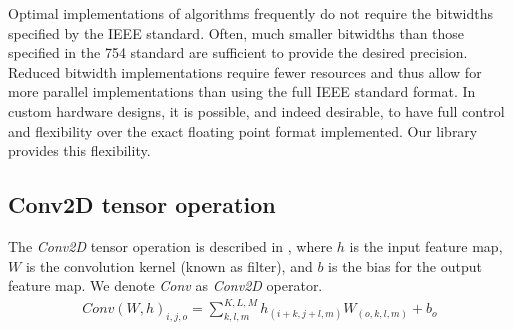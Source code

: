 Optimal implementations of algorithms frequently do not require the bitwidths specified by the IEEE standard. Often, much smaller bitwidths than those specified in the 754 standard are sufficient to provide the desired precision. Reduced bitwidth implementations require fewer resources and thus allow for more parallel implementations than using the full IEEE standard format. In custom hardware designs, it is possible, and indeed desirable, to have full control and flexibility over the exact floating point format implemented. Our library provides this flexibility.

\subsection{Conv2D tensor operation}
The \emph{Conv2D} tensor operation is described in , where $h$ is the input feature map, $W$ is the convolution kernel (known as filter), and $b$ is the bias for the output feature map\cite{goodfellow2016deep}. We denote \emph{Conv} as \emph{Conv2D} operator.
\begin{eqnarray} \label{eq:conv2D}
Conv\left(W,h\right)_{i,j,o}=\sum_{k,l,m}^{K,L,M} h_{(i+k,j+l,m)} W_{(o,k,l,m)}+b_{o}
\end{eqnarray}
